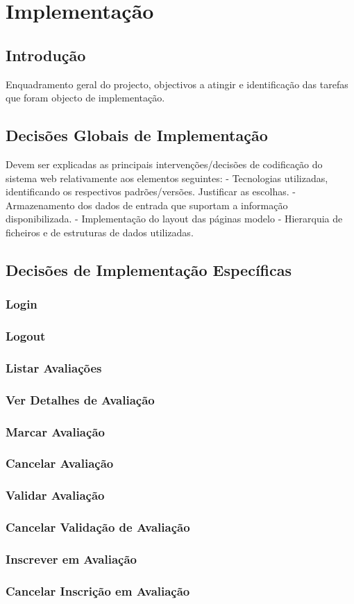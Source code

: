 

\chapter{Implementação}

\section{Introdução}
Enquadramento geral do projecto, objectivos a atingir e identificação das tarefas que foram objecto de implementação.

\section{Decisões Globais de Implementação}

Devem ser explicadas as principais intervenções/decisões de codificação do sistema web relativamente aos elementos seguintes:
- Tecnologias utilizadas, identificando os respectivos padrões/versões. Justificar as escolhas.
- Armazenamento dos dados de entrada que suportam a informação disponibilizada.
- Implementação do layout das páginas modelo
- Hierarquia de ficheiros e de estruturas de dados utilizadas.



\section{Decisões de Implementação Específicas}
\subsection{Login}
\subsection{Logout}
\subsection{Listar Avaliações}
\subsection{Ver Detalhes de Avaliação}
\subsection{Marcar Avaliação}
\subsection{Cancelar Avaliação}
\subsection{Validar Avaliação}
\subsection{Cancelar Validação de Avaliação}
\subsection{Inscrever em Avaliação}
\subsection{Cancelar Inscrição em Avaliação}